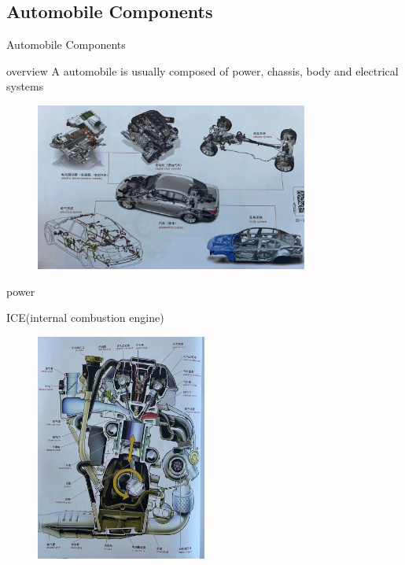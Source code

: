 \subsection{Automobile Components}
\begin{frame}{Automobile Components}
	\begin{block}{overview}
		A automobile is usually composed of power, chassis, body and electrical systems
		\begin{figure}[htbp]
			\centering
			\includegraphics[width=0.8\textwidth]{1-6}
		\end{figure}
	\end{block}
\end{frame}
\begin{frame}
	\begin{block}{power}
		\begin{compactitem}
			\item ICE(internal combustion engine)
				\begin{figure}[htbp]
					\centering
					\includegraphics[width=0.5\textwidth]{1-7}
				\end{figure}
		\end{compactitem}
	\end{block}
\end{frame}
